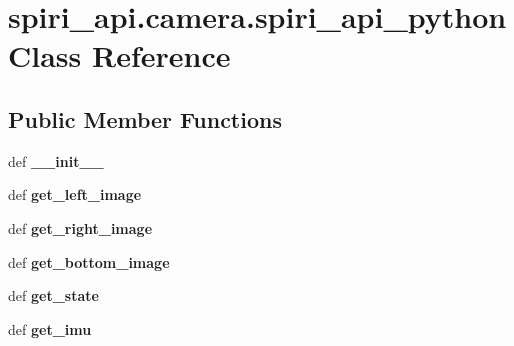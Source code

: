 \hypertarget{classspiri__api_1_1camera_1_1spiri__api__python}{\section{spiri\-\_\-api.\-camera.\-spiri\-\_\-api\-\_\-python \-Class \-Reference}
\label{classspiri__api_1_1camera_1_1spiri__api__python}
}
\subsection*{\-Public \-Member \-Functions}
\begin{DoxyCompactItemize}
\item 
\hypertarget{classspiri__api_1_1camera_1_1spiri__api__python_a39f6df68751e54b55584035bd34bbf49}{def {\bfseries \-\_\-\-\_\-init\-\_\-\-\_\-}}\label{classspiri__api_1_1camera_1_1spiri__api__python_a39f6df68751e54b55584035bd34bbf49}

\item 
\hypertarget{classspiri__api_1_1camera_1_1spiri__api__python_ac32b7e982d746698b483ae77eb510920}{def {\bfseries get\-\_\-left\-\_\-image}}\label{classspiri__api_1_1camera_1_1spiri__api__python_ac32b7e982d746698b483ae77eb510920}

\item 
\hypertarget{classspiri__api_1_1camera_1_1spiri__api__python_a5be11f022eadfa0255ae95f2f312959f}{def {\bfseries get\-\_\-right\-\_\-image}}\label{classspiri__api_1_1camera_1_1spiri__api__python_a5be11f022eadfa0255ae95f2f312959f}

\item 
\hypertarget{classspiri__api_1_1camera_1_1spiri__api__python_a07cbdbd8f83a2075b43f4b1a6b704908}{def {\bfseries get\-\_\-bottom\-\_\-image}}\label{classspiri__api_1_1camera_1_1spiri__api__python_a07cbdbd8f83a2075b43f4b1a6b704908}

\item 
\hypertarget{classspiri__api_1_1camera_1_1spiri__api__python_add9ae9bbf101816b4ca988366992faea}{def {\bfseries get\-\_\-state}}\label{classspiri__api_1_1camera_1_1spiri__api__python_add9ae9bbf101816b4ca988366992faea}

\item 
\hypertarget{classspiri__api_1_1camera_1_1spiri__api__python_abf54f508cde6145b0ea1c7d1b8471724}{def {\bfseries get\-\_\-imu}}\label{classspiri__api_1_1camera_1_1spiri__api__python_abf54f508cde6145b0ea1c7d1b8471724}


\end{DoxyCompactItemize}
